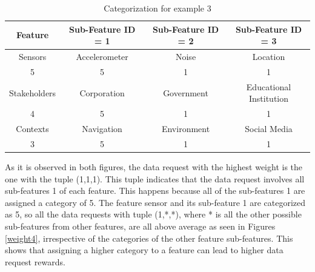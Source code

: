 \begin{table}[h!]
  \centering
  \caption{Categorization for example 3}
  \label{tab:scenario4}
  \begin{tabular}{cccc}
    \toprule
    Feature & Sub-Feature ID = 1 & Sub-Feature ID = 2 & Sub-Feature ID = 3\\
    \midrule
    Sensors & Accelerometer & Noise & Location\\
     5 & 5 & 1 & 1\\ \hhline{====}
     Stakeholders & Corporation & Government & Educational Institution\\
     4 & 5 & 1 & 1\\ \hhline{====}
     Contexts & Navigation & Environment & Social Media\\
     3 & 5 & 1 & 1\\ 
    \bottomrule
  \end{tabular}
\end{table}

As it is observed in both figures, the data request with the highest weight is the one with the tuple (1,1,1). This tuple indicates that the data request involves all sub-features 1 of each feature. This happens because all of the sub-features 1 are assigned a category of 5. The feature sensor and its sub-feature 1 are categorized as 5, so all the data requests
with tuple (1,*,*), where * is all the other possible sub-features from other features, are all above average as seen in Figures \ref{weight4}, irrespective of the categories of the other feature sub-features. This shows that assigning a higher category to a feature can lead to higher data request rewards. 



%

